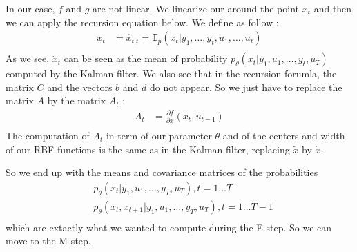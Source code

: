 In our case, $f$ and $g$ are not linear.
We linearize our around the point $\dot{x}_t$ and then we can apply the recursion equation below.
We define  as follow :
\begin{align*}
  \dot{x}_t &= \hat{x}_{t|t} = \mathbb{E}_p(x_t|y_1, \ldots , y_t, u_1, \ldots , u_t) \\
\end{align*}
As we see, $\dot{x}_t$ can be seen as the mean of probability  $p_{\theta}\left(x_t|y_1, u_1, \ldots, y_t, u_T \right )$ computed by the Kalman filter.
We also see that in the recursion forumla, the matrix $C$ and the vectors $b$ and $d$ do not appear.
So we just have to replace the matrix $A$ by the matrix $A_t$ :
\begin{align*}
  A_t &= \frac{\partial f}{\partial x}(\dot{x}_t, u_{t-1})\\
\end{align*}
The computation of $A_t$ in term of our parameter $\theta$ and of the centers and width of our RBF functions is the same as in the Kalman filter, replacing $\tilde{x}$ by $\dot{x}$.

So we end up with the means and covariance matrices of the probabilities
\begin{align*}
  &p_{\theta}\left(x_t|y_1, u_1, \ldots, y_T, u_T \right ), t=1 \ldots T\\
  &p_{\theta}\left(x_t, x_{t+1}|y_1, u_1, \ldots, y_T, u_T \right ), t=1 \ldots T-1\\
\end{align*}
which are extactly what we wanted to compute during the E-step.
So we can move to the M-step.
